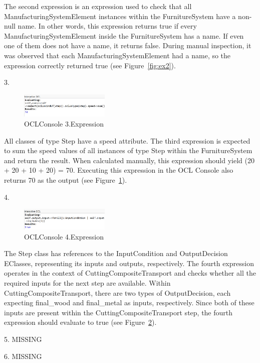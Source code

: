 \documentclass{article}
\begin{document}
The second expression is an expression used to check that all ManufacturingSystemElement instances within the FurnitureSystem have a non-null name. In other words, this expression returns true if every ManufacturingSystemElement inside the FurnitureSystem has a name. If even one of them does not have a name, it returns false. During manual inspection, it was observed that each ManufacturingSystemElement had a name, so the expression correctly returned true (see Figure~\ref{fig:ex2}).

\newpage

3. \begin{figure}
    \centering
    \includegraphics[width=0.38\textwidth]{images/ex3.png}
    \caption{OCLConsole 3.Expression}
    \label{fig:ex3}
\end{figure}
All classes of type Step have a speed attribute. The third expression is expected to sum the speed values of all instances of type Step within the FurnitureSystem and return the result. When calculated manually, this expression should yield (20 + 20 + 10 + 20) = 70. Executing this expression in the OCL Console also returns 70 as the output (see Figure~\ref{fig:ex3}).


4. \begin{figure}
    \centering
    \includegraphics[width=0.38\textwidth]{images/ex4.png}
    \caption{OCLConsole 4.Expression}
    \label{fig:ex4}
\end{figure}

The Step class has references to the InputCondition and OutputDecision EClasses, representing its inputs and outputs, respectively. The fourth expression operates in the context of CuttingCompositeTransport and checks whether all the required inputs for the next step are available.
Within CuttingCompositeTransport, there are two types of OutputDecision, each expecting final\_wood and final\_metal as inputs, respectively.
Since both of these inputs are present within the CuttingCompositeTransport step, the fourth expression should evaluate to true (see Figure~\ref{fig:ex4}).


5. MISSING

6. MISSING
\end{document}
